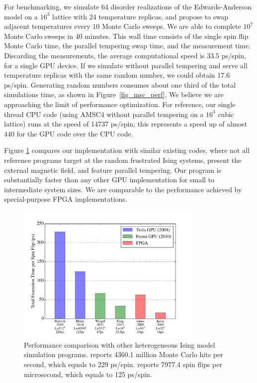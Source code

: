 For benchmarking, we simulate 64 disorder realizations of the
Edwards-Anderson model on a $16^3$ lattice with 24 temperature
replicas, and propose to swap adjacent temperatures every 10 Monte
Carlo sweeps.  We are able to complete $10^7$ Monte Carlo sweeps in 40 minutes. 
This wall time consists of the single spin flip Monte Carlo time,
the parallel tempering swap time, and the measurement time.
Discarding the measurements, the average computational speed is 33.5
ps/spin, for a single GPU device.
If we simulate without parallel tempering and serve all
temperature replicas with the same random number, we could obtain 17.6
ps/spin.  Generating random numbers consumes about one third of the
total simulations time, as shown in Figure~\ref{fig_msc_perf}.  We
believe we are approaching the limit of performance optimization. For
reference, our single thread CPU code (using AMSC4 without parallel tempering on a $16^3$ cubic lattice) runs at the speed of 14737
ps/spin; this represents a speed up of almost 440 for the GPU code over
the CPU code.

Figure \ref{fig_perf} compares our implementation with similar
existing codes, where not all reference programs target at the
random frustrated Ising systems, present the external magnetic field, and feature parallel tempering.
Our program is substantially faster than any other GPU implementation
\cite{CSTN-093,2010CoPhC.181.1549B,doi:10.1142/S0129183112400025,Weigel:2012:PPS:2151219.2151631} for
small to intermediate system sizes. We are comparable to the
performance achieved by special-purpose FPGA
implementations\cite{Baity-Jesi2012}.


\begin{figure}[!ht]
  \centering
  \includegraphics[width=0.8\textwidth]{img/compare.pdf}
  \caption{Performance comparison with other heterogeneous Ising model simulation programs.
\citet{CSTN-093} reports 4360.1 million Monte Carlo hits per second,
which equals to 229 ps/spin.
\citet{2010CoPhC.181.1549B} reports 7977.4 spin flips per microsecond,
which equals to 125 ps/spin.
}
  \label{fig_perf}
\end{figure}
 



